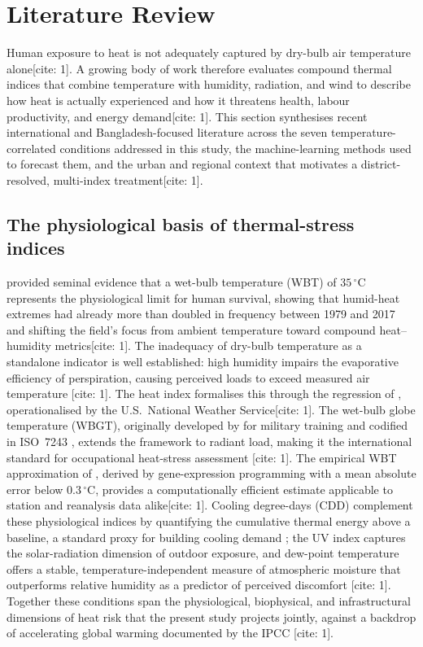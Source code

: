 \documentclass[pdflatex,sn-mathphys-ay]{sn-jnl}
\newcommand{\degC}{\ensuremath{^{\circ}\mathrm{C}}}
\begin{document}
\section{Literature Review}\label{sec:litreview}

Human exposure to heat is not adequately captured by dry-bulb air temperature alone[cite: 1]. A growing body of work therefore evaluates compound thermal indices that combine temperature with humidity, radiation, and wind to describe how heat is actually experienced and how it threatens health, labour productivity, and energy demand[cite: 1]. This section synthesises recent international and Bangladesh-focused literature across the seven temperature-correlated conditions addressed in this study, the machine-learning methods used to forecast them, and the urban and regional context that motivates a district-resolved, multi-index treatment[cite: 1].

\subsection{The physiological basis of thermal-stress indices}
\citet{raymond2020} provided seminal evidence that a wet-bulb temperature (WBT) of $35\,\degC$ represents the physiological limit for human survival, showing that humid-heat extremes had already more than doubled in frequency between 1979 and 2017 and shifting the field's focus from ambient temperature toward compound heat--humidity metrics[cite: 1]. The inadequacy of dry-bulb temperature as a standalone indicator is well established: high humidity impairs the evaporative efficiency of perspiration, causing perceived loads to exceed measured air temperature \citep{steadman1979}[cite: 1]. The heat index formalises this through the regression of \citet{rothfusz1990}, operationalised by the U.S.\ National Weather Service[cite: 1]. The wet-bulb globe temperature (WBGT), originally developed by \citet{yaglou1957} for military training and codified in ISO~7243 \citep{iso7243_2017}, extends the framework to radiant load, making it the international standard for occupational heat-stress assessment \citep{parsons2006}[cite: 1]. The empirical WBT approximation of \citet{stull2011}, derived by gene-expression programming with a mean absolute error below $0.3\,\degC$, provides a computationally efficient estimate applicable to station and reanalysis data alike[cite: 1]. Cooling degree-days (CDD) complement these physiological indices by quantifying the cumulative thermal energy above a baseline, a standard proxy for building cooling demand \citep{spinoni2018, bhatnagar2018}; the UV index \citep{who2002} captures the solar-radiation dimension of outdoor exposure, and dew-point temperature offers a stable, temperature-independent measure of atmospheric moisture that outperforms relative humidity as a predictor of perceived discomfort \citep{lawrence2005}[cite: 1]. Together these conditions span the physiological, biophysical, and infrastructural dimensions of heat risk that the present study projects jointly, against a backdrop of accelerating global warming documented by the IPCC \citep{ipcc2022ar6}[cite: 1].
\end{document}
